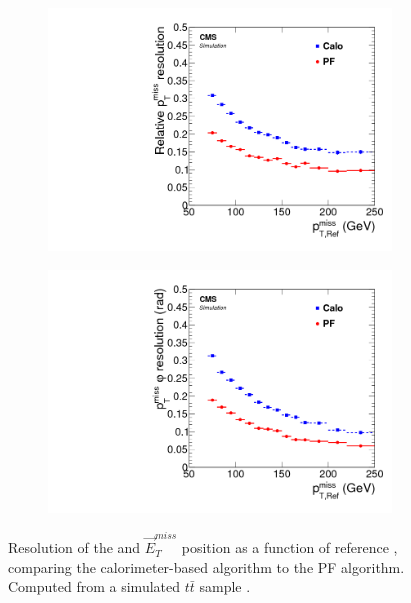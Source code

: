 
\begin{figure}
\centering
\begin{subfigure}{.5\textwidth}
\centering
\includegraphics[width=\linewidth]{plots/Reco/Figure_015-a.png}
\end{subfigure}%
\begin{subfigure}{.5\textwidth}
\centering
\includegraphics[width=\linewidth]{plots/Reco/Figure_015-b.png}
\end{subfigure}%
\caption{Resolution of the \met and $\vec{E}_T^{miss}$ position as a function of reference \met, comparing the calorimeter-based \met algorithm to the PF \met algorithm. Computed from a simulated $t\bar{t}$ sample \protect\cite{Sirunyan_2017}.}
\label{fig:met_compare}
\end{figure}